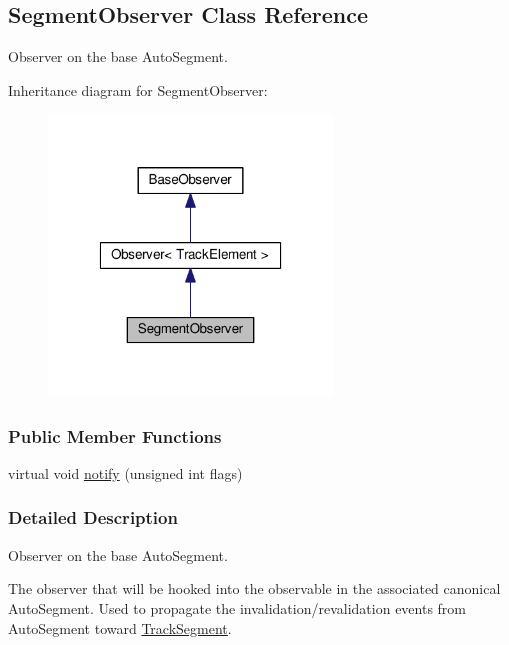\hypertarget{classKite_1_1SegmentObserver}{\subsection{Segment\-Observer Class Reference}
\label{classKite_1_1SegmentObserver}
}


Observer on the base Auto\-Segment.  




Inheritance diagram for Segment\-Observer\-:\nopagebreak
\begin{figure}[H]
\begin{center}
\leavevmode
\includegraphics[width=214pt]{classKite_1_1SegmentObserver__inherit__graph}
\end{center}
\end{figure}
\subsubsection*{Public Member Functions}
\begin{DoxyCompactItemize}
\item 
virtual void \hyperlink{classKite_1_1SegmentObserver_a52e577fb0c4f2e3650928334fb621c2f}{notify} (unsigned int flags)
\end{DoxyCompactItemize}


\subsubsection{Detailed Description}
Observer on the base Auto\-Segment. 

The observer that will be hooked into the observable in the associated canonical Auto\-Segment. Used to propagate the invalidation/revalidation events from Auto\-Segment toward \hyperlink{classKite_1_1TrackSegment}{Track\-Segment}.

